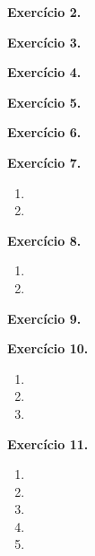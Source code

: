 \documentclass[12pt,a4paper]{article}
\begin{document}
\vspace{0.5cm}
\noindent\textbf{Exercício 2.}

\vspace{0.5cm}
\noindent\textbf{Exercício 3.}

\vspace{0.5cm}
\noindent\textbf{Exercício 4.}

\vspace{0.5cm}
\noindent\textbf{Exercício 5.}

\vspace{0.5cm}
\noindent\textbf{Exercício 6.}

\vspace{0.5cm}
\noindent\textbf{Exercício 7.}
\begin{enumerate}
    \renewcommand{\theenumi}{\alph{enumi}}
    \renewcommand{\labelenumi}{\theenumi)}
    \item 
    \item 
\end{enumerate}

\vspace{0.5cm}
\noindent\textbf{Exercício 8.}
\begin{enumerate}
    \renewcommand{\theenumi}{\alph{enumi}}
    \renewcommand{\labelenumi}{\theenumi)}
    \item 
    \item 
\end{enumerate}

\vspace{0.5cm}
\noindent\textbf{Exercício 9.}

\vspace{0.5cm}
\noindent\textbf{Exercício 10.}
\begin{enumerate}
    \renewcommand{\theenumi}{\alph{enumi}}
    \renewcommand{\labelenumi}{\theenumi)}
    \item 
    \item 
    \item 
\end{enumerate}

\vspace{0.5cm}
\noindent\textbf{Exercício 11.}
\begin{enumerate}
    \renewcommand{\theenumi}{\alph{enumi}}
    \renewcommand{\labelenumi}{\theenumi)}
    \item 
    \item 
    \item 
    \item 
    \item 
\end{enumerate}
\end{document}
